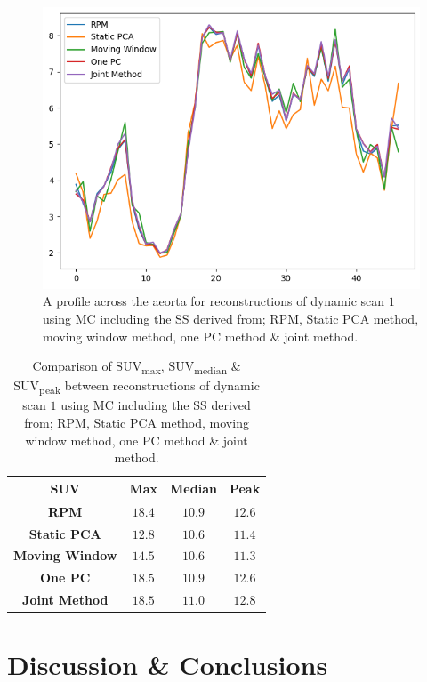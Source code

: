     \begin{figure}
        \centering
        \includegraphics[width=0.5\linewidth]{figures/profile_pca.png}
        \captionsetup{singlelinecheck=false, justification=centering}
        \caption{A profile across the aeorta for reconstructions of dynamic scan $1$ using \gls{MC} including the \gls{SS} derived from; \gls{RPM}, Static \gls{PCA} method, moving window method, one \gls{PC} method \& joint method.}
        \label{fig:profile}
    \end{figure}
    
    \begin{table}
        \centering
        \captionsetup{singlelinecheck=false, justification=centering}
        \caption{Comparison of \gls{SUV}\textsubscript{max}, \gls{SUV}\textsubscript{median} \& \gls{SUV}\textsubscript{peak} between reconstructions of dynamic scan $1$ using \gls{MC} including the \gls{SS} derived from; \gls{RPM}, Static \gls{PCA} method, moving window method, one \gls{PC} method \& joint method.}
        
        \resizebox*{0.5\linewidth}{!}
        {
            \begin{tabular}{||c|ccc||}
                \hline
                \textbf{\gls{SUV}} & \textbf{Max} & \textbf{Median} & \textbf{Peak} \\
                \hline
                \textbf{\gls{RPM}}          & $18.4$ & $10.9$ & $12.6$ \\
                \hline
                \textbf{Static \gls{PCA}}   & $12.8$ & $10.6$ & $11.4$ \\
                \textbf{Moving Window}      & $14.5$ & $10.6$ & $11.3$ \\
                \textbf{One \gls{PC}}       & $18.5$ & $10.9$ & $12.6$ \\
                \textbf{Joint Method}       & $18.5$ & $11.0$ & $12.8$ \\
                \hline
            \end{tabular}
        }
        \label{tab:suv}
    \end{table}
    
     

\section{Discussion \& Conclusions} \label{sec:discussion_and_conclusions}
    
